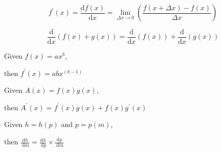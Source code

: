 
\begin{minipage}{0.48\textwidth}
	
	
	\[ f^{\prime}(x)=\frac{\mathrm{d} f(x)}{\mathrm{d} x}=\lim _{\Delta x \rightarrow 0}\left(\frac{f(x+\Delta x)-f(x)}{\Delta x}\right)\]
	
	\divider
	
	
	\[
		\frac{\mathrm{d}}{\mathrm{d} x}(f(x)+g(x))=\frac{\mathrm{d}}{\mathrm{d} x}(f(x))+\frac{\mathrm{d}}{\mathrm{d} x}(g(x))
	\]
	
	\divider
	
	
	\vspace{-0.15cm}
	
	\begin{center}
		Given $f(x)=a x^{b}$,
		
		then $f^{\prime}(x)=a b x^{(b-1)}$
	\end{center}
	
	\vspace{-0.15cm}
	
	\divider
	
	
	\vspace{-0.15cm}
	
	\begin{center}
		Given $A(x)=f(x) g(x)$,
		
		then $A^{\prime}(x)=f^{\prime}(x) g(x)+f(x) g^{\prime}(x)$
	\end{center}
	
	\vspace{-0.15cm}
	
	\divider
	
	
	\vspace{-0.15cm}
	
	\begin{center}
		Given $h=h(p)$ and $p=p(m)$,
		
		then $\frac{\mathrm{d} h}{\mathrm{~d} m}=\frac{\mathrm{d} h}{\mathrm{~d} p} \times \frac{\mathrm{d} p}{\mathrm{~d} m}$
	\end{center}
	
	\vspace{-0.15cm}
	

\end{minipage}
